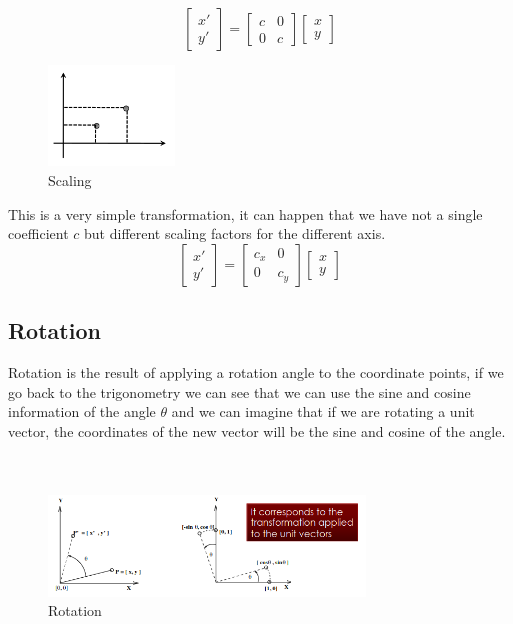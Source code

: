 \[
\begin{bmatrix}
    x' \\
    y'
    \end{bmatrix}
    =
    \begin{bmatrix}
    c & 0 \\
    0 & c
    \end{bmatrix}
    \begin{bmatrix}
    x \\
    y
    \end{bmatrix}
\]

\begin{figure}[ht]
    \centering
    \includegraphics[width=0.3\textwidth]{Figures/scaling.png}
    \caption{Scaling}
    \label{fig:scaling}
\end{figure}

This is a very simple transformation, it can happen that we have not a single coefficient \(c\) but different scaling factors for the different axis.
\[
\begin{bmatrix}
    x' \\
    y'
    \end{bmatrix}
    =
    \begin{bmatrix}
    c_x & 0 \\
    0 & c_y
    \end{bmatrix}
    \begin{bmatrix}
    x \\
    y
    \end{bmatrix}
\]

\subsection{Rotation}

Rotation is the result of applying a rotation angle to the coordinate points, if we go back to the trigonometry we can see that we can use the sine and cosine information of the angle \(\theta\) and we can imagine that if we are rotating a unit vector, the coordinates of the new vector will be the sine and cosine of the angle.
\\\\\\
\begin{figure}[ht]
    \centering
    \includegraphics[width=0.75\textwidth]{Figures/rotation.png}
    \caption{Rotation}
    \label{fig:rotation}
\end{figure}

